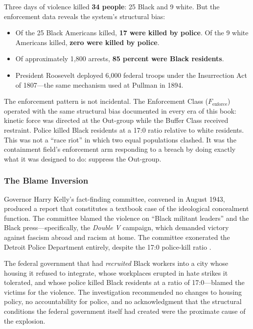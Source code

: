 \documentclass[12pt,openany]{book}
\providecommand{\tightlist}{\setlength{\itemsep}{0pt}\setlength{\parskip}{0pt}}
\begin{document}
Three days of violence killed \textbf{34 people}: 25 Black and 9 white. But the enforcement data reveals the system's structural bias:

\begin{itemize}
  \tightlist
  \item Of the 25 Black Americans killed, \textbf{17 were killed by police}. Of the 9 white Americans killed, \textbf{zero were killed by police}.
  \item Of approximately 1,800 arrests, \textbf{85 percent were Black residents}.
  \item President Roosevelt deployed 6,000 federal troops under the Insurrection Act of 1807---the same mechanism used at Pullman in 1894.
\end{itemize}

The enforcement pattern is not incidental. The Enforcement Class ($F_{\text{enforce}}$) operated with the same structural bias documented in every era of this book: kinetic force was directed at the Out-group while the Buffer Class received restraint. Police killed Black residents at a 17:0 ratio relative to white residents. This was not a ``race riot'' in which two equal populations clashed. It was the containment field's enforcement arm responding to a breach by doing exactly what it was designed to do: suppress the Out-group.

\subsubsection{The Blame Inversion}

Governor Harry Kelly's fact-finding committee, convened in August 1943, produced a report that constitutes a textbook case of the ideological concealment function. The committee blamed the violence on ``Black militant leaders'' and the Black press---specifically, the \textit{Double V} campaign, which demanded victory against fascism abroad and racism at home. The committee exonerated the Detroit Police Department entirely, despite the 17:0 police-kill ratio \cite{capeci_detroit}.

The federal government that had \textit{recruited} Black workers into a city whose housing it refused to integrate, whose workplaces erupted in hate strikes it tolerated, and whose police killed Black residents at a ratio of 17:0---blamed the victims for the violence. The investigation recommended no changes to housing policy, no accountability for police, and no acknowledgment that the structural conditions the federal government itself had created were the proximate cause of the explosion.
\end{document}
